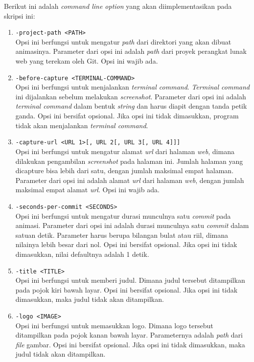Berikut ini adalah \textit{command line option} yang akan diimplementasikan pada skripsi ini:
\begin{enumerate}
\item \texttt{-project-path <PATH>}\\
Opsi ini berfungsi untuk mengatur \textit{path} dari direktori yang akan dibuat animasinya. Parameter dari opsi ini adalah \textit{path} dari proyek perangkat lunak web yang terekam oleh Git. Opsi ini wajib ada.

\item \texttt{-before-capture <TERMINAL-COMMAND>}\\
Opsi ini berfungsi untuk menjalankan \textit{terminal command}. \textit{Terminal command} ini dijalankan sebelum melakukan \textit{screenshot}. Parameter dari opsi ini adalah \textit{terminal command} dalam bentuk \textit{string} dan harus diapit dengan tanda petik ganda. Opsi ini bersifat opsional. Jika opsi ini tidak dimasukkan, program tidak akan menjalankan \textit{terminal command}.

\item \texttt{-capture-url <URL 1>[, URL 2[, URL 3[, URL 4]]]}\\
Opsi ini berfungsi untuk mengatur alamat \textit{url} dari halaman \textit{web}, dimana dilakukan pengambilan \textit{screenshot} pada halaman ini. Jumlah halaman yang dicapture bisa lebih dari satu, dengan jumlah maksimal empat halaman. Parameter dari opsi ini adalah alamat \textit{url} dari halaman \textit{web}, dengan jumlah maksimal empat alamat \textit{url}. Opsi ini wajib ada.

\item \texttt{-seconds-per-commit <SECONDS>}\\
Opsi ini berfungsi untuk mengatur durasi munculnya satu \textit{commit} pada animasi. Parameter dari opsi ini adalah durasi munculnya satu \textit{commit} dalam satuan detik. Parameter harus berupa bilangan bulat atau riil, dimana nilainya lebih besar dari nol. Opsi ini bersifat opsional. Jika opsi ini tidak dimasukkan, nilai defaultnya adalah 1 detik.

\item \texttt{-title <TITLE>}\\
Opsi ini berfungsi untuk memberi judul. Dimana judul tersebut ditampilkan pada pojok kiri
bawah layar. Opsi ini bersifat opsional. Jika opsi ini tidak dimasukkan, maka judul tidak akan ditampilkan.  

\item \texttt{-logo <IMAGE>}\\
Opsi ini berfungsi untuk memasukkan logo. Dimana logo tersebut ditampilkan pada pojok kanan
bawah layar. Parameternya adalah \textit{path} dari \textit{file} gambar. Opsi ini bersifat opsional. Jika opsi ini tidak dimasukkan, maka judul tidak akan ditampilkan.


\end{enumerate}
